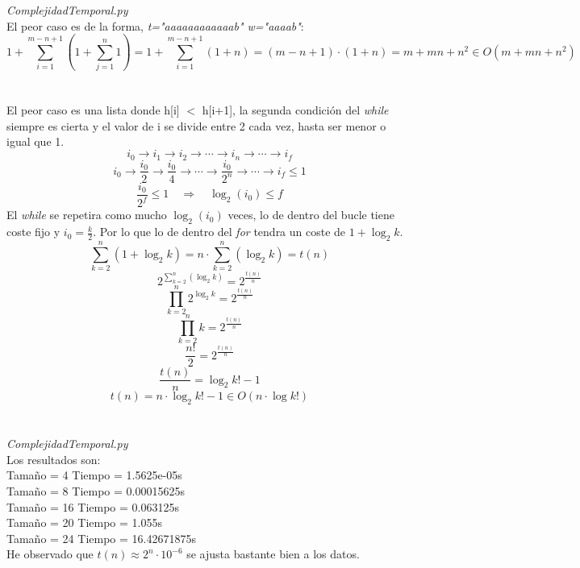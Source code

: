 \documentclass{article}
\begin{document}
\section{}
\textit{ComplejidadTemporal.py}\\
El peor caso es de la forma, \textit{t="aaaaaaaaaaaab" w="aaaab"}:
$$
1 + \sum_{i=1}^{m-n+1} ( 1 + \sum_{j=1}^{n} 1 ) = 1 + \sum_{i=1}^{m-n+1} ( 1 + n ) = (m-n+1) \cdot ( 1 + n ) = m + mn + n^2 \in O( m + mn + n^2 )
$$
\section{}
El peor caso es una lista donde h[i] $<$ h[i+1], la segunda condición del \textit{while} siempre es cierta y el valor de i se divide entre 2 cada vez, hasta ser menor o igual que 1.
$$
i_0 \to i_1 \to i_2 \to \cdots \to i_n \to \cdots \to i_f
$$
$$
i_0 \to \frac{i_0}{2} \to \frac{i_0}{4} \to \cdots \to \frac{i_0}{2^n} \to \cdots \to i_f \le 1
$$
$$
\frac{i_0}{2^f} \le 1 \quad \Rightarrow \quad \log_2 ( i_0 ) \le f
$$
El \textit{while} se repetira como mucho $\log_2 ( i_0 )$ veces, lo de dentro del bucle tiene coste fijo y $i_0 = \frac{k}{2}$. Por lo que lo de dentro del \textit{for} tendra un coste de $1 + \log_2 k$.
$$
\sum_{k=2}^{n} ( 1 + \log_2 k ) = n \cdot \sum_{k=2}^{n} ( \log_2 k ) = t(n)
$$
$$
2^{ \sum_{k=2}^{n} ( \log_2 k ) } = 2^{\frac{t(n)}{n}}
$$
$$
\prod_{k=2}^n 2^{\log_2 k} = 2^{\frac{t(n)}{n}}
$$
$$
\prod_{k=2}^n  k = 2^{\frac{t(n)}{n}}
$$
$$
\frac{n!}{2} = 2^{\frac{t(n)}{n}}
$$
$$
\frac{t(n)}{n} = \log_2 k! - 1
$$
$$
t(n) = n \cdot \log_2 k! -1 \in O(n\cdot \log k!)
$$
\section{}
\textit{ComplejidadTemporal.py}\\
Los resultados son:\\
Tamaño = 4 Tiempo = 1.5625e-05s\\
Tamaño = 8 Tiempo = 0.00015625s\\
Tamaño = 16 Tiempo = 0.063125s\\
Tamaño = 20 Tiempo = 1.055s\\
Tamaño = 24 Tiempo = 16.42671875s\\
He observado que $t(n) \approx 2^n \cdot 10^{-6}$ se ajusta bastante bien a los datos.
\end{document}
